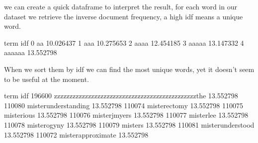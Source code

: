 \documentclass[letterpaper,10pt,english]{jupyterBook}
\begin{document}
\sphinxAtStartPar
we can create a quick dataframe to interpret the result, for each word in our dataset we retrieve the inverse document frequency, a high idf means a unique word.

\begin{sphinxVerbatim}[commandchars=\\\{\}]
  
       
       
\end{sphinxVerbatim}

\begin{sphinxVerbatim}[commandchars=\\\{\}]
     term        idf
0      aa  10.026437
1     aaa  10.275653
2    aaaa  12.454185
3   aaaaa  13.147332
4  aaaaaa  13.552798
\end{sphinxVerbatim}

\sphinxAtStartPar
When we sort them by idf we can find the most unique words, yet it doesn’t seem to be useful at the moment.

\begin{sphinxVerbatim}[commandchars=\\\{\}]
 
\end{sphinxVerbatim}

\begin{sphinxVerbatim}[commandchars=\\\{\}]
                                                     term        idf
196600  zzzzzzzzzzzzzzzzzzzzzzzzzzzzzzzzzzzzzzzzzzzzzzthe  13.552798
110080                                misterunderstanding  13.552798
110074                                       misterectomy  13.552798
110075                                         misterious  13.552798
110076                                       misterjmyers  13.552798
110077                                          misterlee  13.552798
110078                                        misterogyny  13.552798
110079                                            misters  13.552798
110081                                   misterunderstood  13.552798
110072                                  misterapproximate  13.552798
\end{sphinxVerbatim}







\renewcommand{\indexname}{Index}
\printindex
\end{document}
